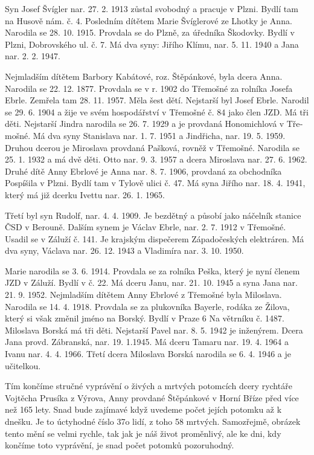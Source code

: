 \documentclass[../dejiny-rodu-prusiku.tex]{subfiles}
\begin{document}
Syn Josef Švígler nar. 27. 2. 1913 zůstal svobodný a pracuje v Plzni. Bydlí tam na Husově nám. č. 4. Posledním dítětem Marie Švíglerové ze Lhotky je Anna. Narodila se 28. 10. 1915. Provdala se do Plzně, za úřední­ka Škodovky. Bydlí v Plzni, Dobrovského ul. č. 7. Má dva syny: Jiřího Klímu, nar. 5. 11. 1940 a Jana nar. 2. 2. 1947.

Nejmladším dítětem Barbory Kabátové, roz. Štěpánkové, byla dcera Anna. Narodila se 22. 12. 1877. Provdala se v r. 1902 do Třemošné za rolníka Josefa Ebrle. Zemřela tam 28. 11. 1957. Měla šest dětí. Nejstarší byl Josef Ebrle. Narodil se 29. 6. 1904 a žije ve svém hospodářství v Třemošné č. 84 jako člen JZD. Má tři děti. Nejstarší Jindra narodila se 26. 7. 1929 a je provdaná Honomichlová v Tře­mošné. Má dva syny Stanislava nar. 1. 7. 1951 a Jindřicha, nar. 19. 5. 1959. Druhou dcerou je Miroslava provdaná Pašková, rovněž v Třemošné. Narodila se 25. 1. 1932 a má dvě děti. Otto nar. 9. 3. 1957 a dcera Miroslava nar. 27. 6. 1962. Druhé dítě Anny Ebrlové je Anna nar. 8. 7. 1906, provdaná za obchodníka Pospíšila v Plzni. Bydlí tam v Tylově ulici č. 47. Má syna Jiřího nar. 18. 4. 1941, který má již dcerku Ivettu nar. 26. 1. 1965.

Třetí byl syn Rudolf, nar. 4. 4. 1909. Je bezdětný a půso­bí jako náčelník stanice ČSD v Berouně. Dalším synem je Václav Ebrle, nar. 2. 7. 1912 v Třemošné. Usadil se v Záluží č. 141. Je krajským dispečerem Západočeských elektráren. Má dva syny, Václava nar. 26. 12. 1943 a Vladimíra nar. 3. 10. 1950.

Marie narodila se 3. 6. 1914. Provdala se za rolníka Peška, který je nyní členem JZD v Záluží. Bydlí v č. 22. Má dce­ru Janu, nar. 21. 10. 1945 a syna Jana nar. 21. 9. 1952. Nejmladším dítětem Anny Ebrlové z Třemošné byla Milosla­va. Narodila se 14. 4. 1918. Provdala se za plukovníka Bayerle, rodáka ze Žilova, který si však změnil jméno na Borský. Bydlí v Praze 6 Na větrníku č. 1487. Miloslava Borská má tři děti. Nejstarší Pavel nar. 8. 5. 1942 je inženýrem. Dcera Jana provd. Zábranská, nar. 19. 1.1945. Má dceru Tamaru nar. 19. 4. 1964 a Ivanu nar. 4. 4. 1966. Třetí dcera Miloslava Borská narodila se 6. 4. 1946 a je učitelkou.

Tím končíme stručné vyprávění o živých a mrtvých potomcích dcery rychtáře Vojtěcha Prusíka z Výrova, Anny provdané Štěpánkové v Horní Bříze před více než 165 lety. Snad bude zajímavé když uvedeme počet jejích potomku až k dnešku. Je to úctyhodné číslo 37o lidí, z toho 58 mrtvých. Samo­zřejmě, obrázek tento mění se velmi rychle, tak jak je náš život proměnlivý, ale ke dni, kdy končíme toto vyprávění, je snad počet potomků pozoruhodný.
\end{document}
